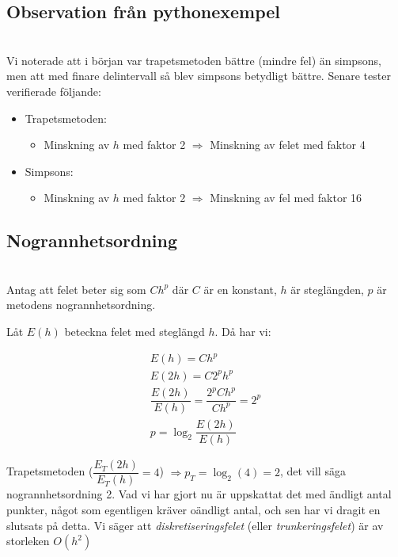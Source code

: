 \subsection{Observation från pythonexempel}\hfill\\

\noindent Vi noterade att i början var trapetsmetoden bättre (mindre fel) än simpsons, men att med finare delintervall så blev simpsons betydligt bättre. Senare tester verifierade följande:

\begin{itemize}
  \item Trapetsmetoden:
    \begin{itemize}
      \item Minskning av $h$ med faktor 2 $\Rightarrow$ Minskning av felet med faktor 4
    \end{itemize}
  \item Simpsons:
    \begin{itemize}
      \item Minskning av $h$ med faktor 2 $\Rightarrow$ Minskning av fel med faktor 16
    \end{itemize}
\end{itemize}

\subsection{Nogrannhetsordning}\hfill\\

\noindent Antag att felet beter sig som $Ch^p$ där $C$ är en konstant, $h$ är steglängden, $p$ är metodens nogrannhetsordning.\par\noindent Låt $E(h)$ beteckna felet med steglängd $h$. Då har vi:


\begin{equation*}
  \begin{gathered}
    E(h)=Ch^p\\
    E(2h)=C2^ph^p\\
    \dfrac{E(2h)}{E(h)}=\dfrac{2^pCh^p}{Ch^p}=2^p\\
    p=\log_2\dfrac{E(2h)}{E(h)}
  \end{gathered}
\end{equation*}
\par\bigskip

\noindent Trapetsmetoden ($\dfrac{E_T(2h)}{E_T(h)}=4$) $\Rightarrow p_T=\log_2(4)=2$, det vill säga nogrannhetsordning 2. Vad vi har gjort nu är uppskattat det med ändligt antal punkter, något som egentligen kräver oändligt antal, och sen har vi dragit en slutsats på detta. Vi säger att \textit{diskretiseringsfelet} (eller \textit{trunkeringsfelet}) är av storleken $O(h^2)$
\par\bigskip

